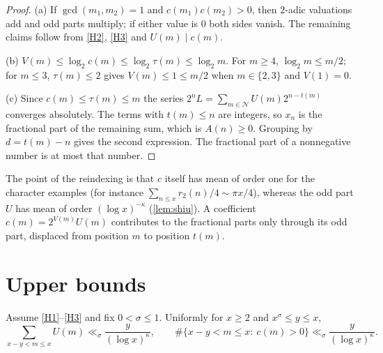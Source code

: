 \documentclass[11pt]{article}
\begin{document}
\begin{proof}
(a) If $\gcd(m_1,m_2)=1$ and $c(m_1)c(m_2)>0$, then $2$-adic valuations add
and odd parts multiply; if either value is $0$ both sides vanish. The remaining
claims follow from \ref{H2}, \ref{H3} and $U(m)\mid c(m)$.

(b) $V(m)\le\log_2c(m)\le\log_2\tau(m)\le\log_2 m$. For $m\ge4$,
$\log_2m\le m/2$; for $m\le3$, $\tau(m)\le2$ gives $V(m)\le1\le m/2$ when
$m\in\{2,3\}$ and $V(1)=0$.

(c) Since $c(m)\le\tau(m)\le m$ the series
$2^nL=\sum_{m\in\mathcal N}U(m)2^{n-t(m)}$ converges absolutely. The terms
with $t(m)\le n$ are integers, so $x_n$ is the fractional part of the remaining
sum, which is $A(n)\ge0$. Grouping by $d=t(m)-n$ gives the second expression.
The fractional part of a nonnegative number is at most that number.
\end{proof}

The point of the reindexing is that $c$ itself has mean of order one for the
character examples (for instance $\sum_{n\le x}r_2(n)/4\sim\pi x/4$), whereas
the odd part $U$ has mean of order $(\log x)^{-\kappa}$ (\cref{lem:shiu}).
A coefficient $c(m)=2^{V(m)}U(m)$ contributes to the fractional parts only
through its odd part, displaced from position $m$ to position $t(m)$.

\section{Upper bounds}\label{sec:upper}

\begin{lemma}\label{lem:shiu}
Assume \ref{H1}--\ref{H3} and fix $0<\sigma\le1$. Uniformly for $x\ge2$ and
$x^\sigma\le y\le x$,
\[
\sum_{x-y<m\le x}U(m)\ll_\sigma\frac{y}{(\log x)^{\kappa}},\qquad
\#\{x-y<m\le x:\ c(m)>0\}\ll_\sigma\frac{y}{(\log x)^{\kappa}} .
\]
\end{lemma}
\end{document}
